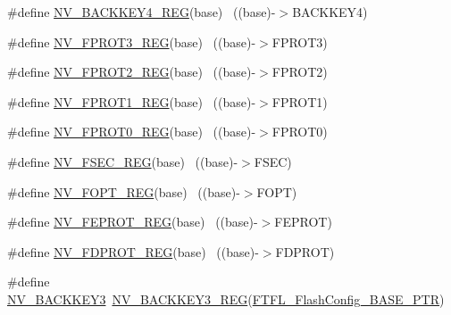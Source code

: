 \begin{DoxyCompactItemize}
\item 
\#define \hyperlink{group___n_v___register___accessor___macros_gae867c53e6918c6a7c16ccba9ee512dc1}{N\+V\+\_\+\+B\+A\+C\+K\+K\+E\+Y4\+\_\+\+R\+EG}(base)                                    ~((base)-\/$>$B\+A\+C\+K\+K\+E\+Y4)
\item 
\#define \hyperlink{group___n_v___register___accessor___macros_gad8e367bb2e9aae8570a3736ec8a4aee9}{N\+V\+\_\+\+F\+P\+R\+O\+T3\+\_\+\+R\+EG}(base)                                        ~((base)-\/$>$F\+P\+R\+O\+T3)
\item 
\#define \hyperlink{group___n_v___register___accessor___macros_gae06ab638a7b4ad4757c89118971127d0}{N\+V\+\_\+\+F\+P\+R\+O\+T2\+\_\+\+R\+EG}(base)                                        ~((base)-\/$>$F\+P\+R\+O\+T2)
\item 
\#define \hyperlink{group___n_v___register___accessor___macros_ga1f9fafcb15ed5d1b27020f5b04edfe00}{N\+V\+\_\+\+F\+P\+R\+O\+T1\+\_\+\+R\+EG}(base)                                        ~((base)-\/$>$F\+P\+R\+O\+T1)
\item 
\#define \hyperlink{group___n_v___register___accessor___macros_ga04dc6fb630cffc56b5fff1847704cc53}{N\+V\+\_\+\+F\+P\+R\+O\+T0\+\_\+\+R\+EG}(base)                                        ~((base)-\/$>$F\+P\+R\+O\+T0)
\item 
\#define \hyperlink{group___n_v___register___accessor___macros_gafcfd540f11abf7f4644b7c5a5bc272fe}{N\+V\+\_\+\+F\+S\+E\+C\+\_\+\+R\+EG}(base)                                            ~((base)-\/$>$F\+S\+EC)
\item 
\#define \hyperlink{group___n_v___register___accessor___macros_ga66cb061090c7bd7c8b2447b133a93ce5}{N\+V\+\_\+\+F\+O\+P\+T\+\_\+\+R\+EG}(base)                                            ~((base)-\/$>$F\+O\+PT)
\item 
\#define \hyperlink{group___n_v___register___accessor___macros_ga689f6db632fecfda17b3a0af63529b29}{N\+V\+\_\+\+F\+E\+P\+R\+O\+T\+\_\+\+R\+EG}(base)                                        ~((base)-\/$>$F\+E\+P\+R\+OT)
\item 
\#define \hyperlink{group___n_v___register___accessor___macros_ga8c387944c38c4df1397982458df8a2f1}{N\+V\+\_\+\+F\+D\+P\+R\+O\+T\+\_\+\+R\+EG}(base)                                        ~((base)-\/$>$F\+D\+P\+R\+OT)
\item 
\#define \hyperlink{group___n_v___register___accessor___macros_ga18932af5b184d02998db112b364e45e1}{N\+V\+\_\+\+B\+A\+C\+K\+K\+E\+Y3}~\hyperlink{group___n_v___register___accessor___macros_ga3f3d8bddafcafafb27fb8981656492e1}{N\+V\+\_\+\+B\+A\+C\+K\+K\+E\+Y3\+\_\+\+R\+EG}(\hyperlink{group___n_v___peripheral_gad199a235b90fe3e6afb977f2d6a9c565}{F\+T\+F\+L\+\_\+\+Flash\+Config\+\_\+\+B\+A\+S\+E\+\_\+\+P\+TR})

\end{DoxyCompactItemize}
